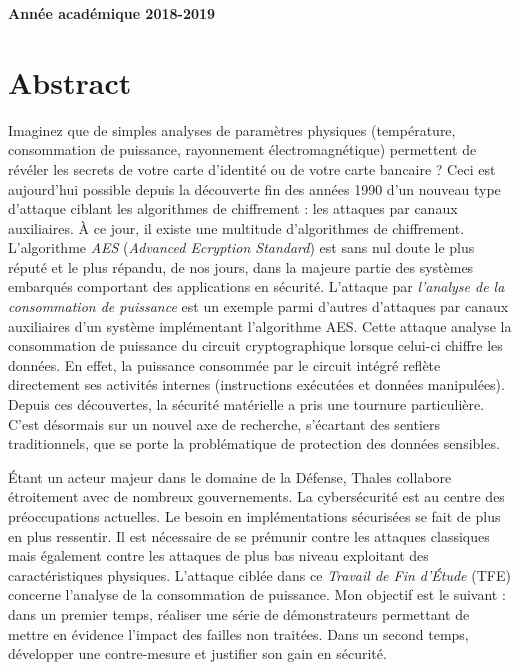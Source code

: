 \documentclass[oneside]{book}
\begin{document}
\vfill 
\centerline{\textbf{Année académique 2018-2019}}

\newpage
\strut
\thispagestyle{empty}
\newpage
\fancyfoot[C]{\thepage}

{} %
\null\vfil
\section*{\centering Abstract}

Imaginez que de simples analyses de paramètres physiques (température, consommation de puissance, rayonnement électromagnétique) permettent de révéler les secrets de votre carte d'identité ou de votre carte bancaire ?  
Ceci est aujourd'hui possible depuis la découverte fin des années 1990 d'un nouveau type d'attaque ciblant les algorithmes de chiffrement : les attaques par canaux auxiliaires. À ce jour, il existe une multitude d’algorithmes de chiffrement. L’algorithme \textit{AES} (\textit{Advanced Ecryption Standard}) est sans nul doute le plus réputé et le plus répandu, de nos jours, dans la majeure partie des systèmes embarqués comportant des applications en sécurité. L'attaque par \textit{l'analyse de la consommation de puissance} est un exemple parmi d'autres d'attaques par canaux auxiliaires d'un système implémentant l'algorithme AES. Cette attaque analyse la consommation de puissance du circuit cryptographique lorsque celui-ci chiffre les données. En effet, la puissance consommée par le circuit intégré reflète directement ses activités internes (instructions exécutées et données manipulées). Depuis ces découvertes, la sécurité matérielle a pris une tournure particulière. C’est désormais sur un nouvel axe de recherche, s’écartant des sentiers traditionnels, que se porte la problématique de protection des données sensibles.

Étant un acteur majeur dans le domaine de la Défense, Thales collabore étroitement avec de nombreux gouvernements. La cybersécurité est au centre des préoccupations actuelles. Le besoin en implémentations sécurisées se fait de plus en plus ressentir. Il est nécessaire de se prémunir contre les attaques classiques mais également contre les attaques de plus bas niveau exploitant des caractéristiques physiques. L'attaque ciblée dans ce \textit{Travail de Fin d'Étude} (TFE) concerne l'analyse de la consommation de puissance. Mon objectif est le suivant : dans un premier temps, réaliser une série de démonstrateurs permettant de mettre en évidence l'impact des failles non traitées. Dans un second temps, développer une contre-mesure et justifier son gain en sécurité.
\end{document}
